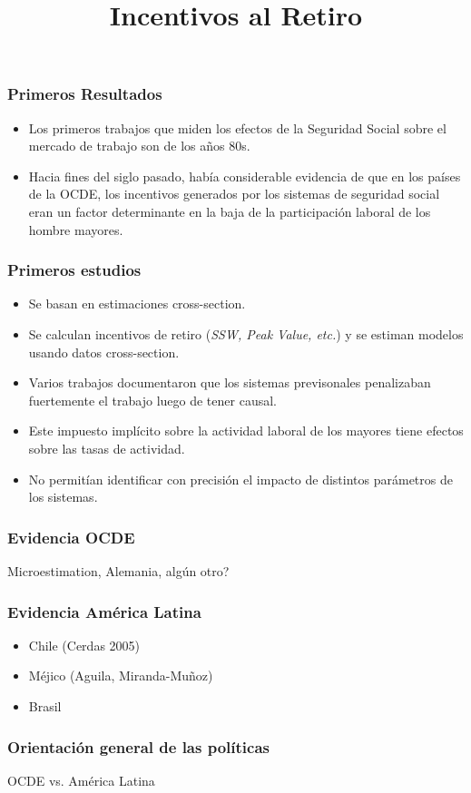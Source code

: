 \documentclass{beamer}
\title{Incentivos al Retiro}
\begin{document}
\begin{frame}
\maketitle
\end{frame}



\frame
{
  \frametitle{Primeros Resultados}
  \begin{itemize}
  \item Los primeros trabajos que miden los efectos de la Seguridad Social sobre el mercado de trabajo son de los años 80s.
  \item Hacia fines del siglo pasado, había considerable evidencia de que en los países de la OCDE, los incentivos generados por los sistemas de seguridad social eran un factor determinante en la baja de la participación laboral de los hombre mayores.
  \end{itemize}
}



\frame
{
  \frametitle{Primeros estudios}
  \begin{itemize}
  \item Se basan en estimaciones cross-section.
  \item Se calculan incentivos de retiro (\textit{SSW, Peak Value, etc.}) y se estiman modelos usando datos cross-section.
  \item Varios trabajos documentaron que los sistemas previsonales penalizaban fuertemente el trabajo luego de tener causal.
  \item Este impuesto implícito sobre la actividad laboral de los mayores tiene efectos sobre las tasas de actividad.
  \item No permitían identificar con precisión el impacto de distintos parámetros de los sistemas.
  \end{itemize}
}

\frame
{
  \frametitle{Evidencia OCDE}
  Microestimation, Alemania, algún otro?
}

\frame
{
  \frametitle{Evidencia América Latina}
  \begin{itemize}
  \item Chile (Cerdas 2005)
  \item Méjico (Aguila, Miranda-Muñoz)
  \item Brasil
  \end{itemize}
}

\frame
{
  \frametitle{Orientación general de las políticas}
  
  OCDE vs. América Latina
  
  
}
\end{document}

